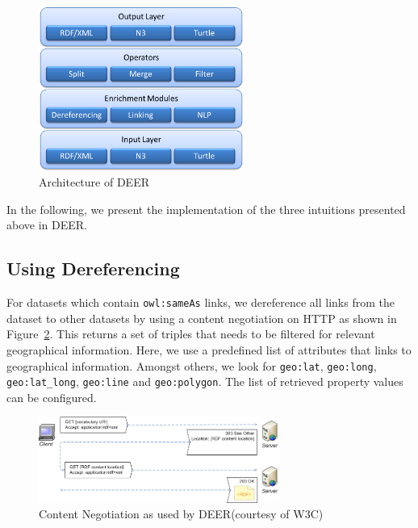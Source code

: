 \documentclass[a4paper,twoside,bibtotoc,abstracton,12pt,BCOR=15mm]{article}
\newcommand{\geolift}{\textsc{DEER}\xspace}
\begin{document}
\begin{figure}[ht!]
			\centering
			\includegraphics[width = 0.6\textwidth]{images/geolift_architecture.png}
			\caption{Architecture of \geolift}
			\label{fig:architecture}
		\end{figure}

In the following, we present the implementation of the three intuitions presented above in \geolift.
\subsection{Using Dereferencing}
For datasets which contain \texttt{owl:sameAs} links, we dereference all links from the dataset to other datasets by using a content negotiation on HTTP as shown in Figure~\ref{fig:contentNegotiation}.
This returns a set of triples that needs to be filtered for relevant geographical information.
Here, we use a predefined list of attributes that links to geographical information.
Amongst others, we look for \texttt{geo:lat}, \texttt{geo:long}, \texttt{geo:lat\_long}, \texttt{geo:line} and \texttt{geo:polygon}.
The list of retrieved property values can be configured.

\begin{figure}[htb]
\centering
\includegraphics[width=0.7\textwidth]{images/contentnegotiation}
\caption{Content Negotiation as used by \geolift (courtesy of W3C)}
\label{fig:contentNegotiation}
\end{figure}
\end{document}
